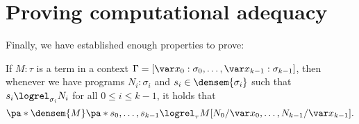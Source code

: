 \section{Proving computational adequacy}

Finally, we have established enough properties to prove:
\begin{lemma}\label{fundamental-theorem}
  If \(M : \tau\) is a term in a context
  \(\Gamma = [\var x_0 : \sigma_0 , \dots , \var x_{k-1} : \sigma_{k-1}]\), then
  whenever we have programs \(N_i : \sigma_i\) and
  \(s_i \in \densem{\sigma_i}\) such that \(s_i \logrel_{\sigma_i} N_i\) for all
  \(0 \leq i \leq k-1\), it holds that
  \[
    \pa*{\densem{M}\pa*{s_0,\dots,s_{k-1}}} \logrel_{\tau} {M[N_0/\var x_0,\dots,N_{k-1}/\var x_{k-1}]}.
  \]
\end{lemma}


